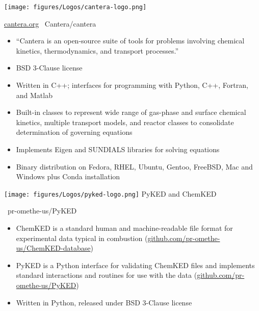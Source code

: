 \begin{frame}{
 \hspace{-5mm}
 \texttt{[image: figures/Logos/cantera-logo.png]}
}

\url{cantera.org}
\hspace{10mm}
\ghinlinelogo\ Cantera/cantera

\vspace{5mm}

\begin{itemize}
 \item ``Cantera is an open-source suite of tools for problems involving chemical kinetics, thermodynamics, and transport processes.''
 \item BSD 3-Clause license
 \item Written in C++; interfaces for programming with Python, C++, Fortran, and Matlab
 \item Built-in classes to represent wide range of gas-phase and surface chemical kinetics, multiple transport models, and reactor classes to consolidate determination of governing equations
 \item Implements Eigen and SUNDIALS libraries for solving equations
 \item Binary distribution on Fedora, RHEL, Ubuntu, Gentoo, FreeBSD, Mac and Windows plus Conda installation
\end{itemize}


\end{frame}

\begin{frame}{ \hspace{-5mm}
 \texttt{[image: figures/Logos/pyked-logo.png]}
 PyKED and ChemKED}
 
 
\ghinlinelogo\ pr-omethe-us/PyKED

\vspace{5mm}

\begin{itemize}
 \item ChemKED is a standard human and machine-readable file format for experimental data typical in combustion (\url{github.com/pr-omethe-us/ChemKED-database})
 \item PyKED is a Python interface for validating ChemKED files and implements standard interactions and routines for use with the data (\url{github.com/pr-omethe-us/PyKED})
 \item Written in Python, released under BSD 3-Clause license
\end{itemize}

 
\end{frame}


